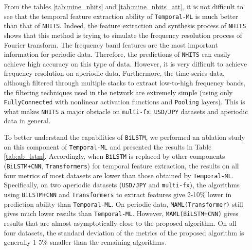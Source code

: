 \documentclass[a4paper,fleqn]{cas-sc}
\begin{document}
From the tables \ref{tab:mine_nhits} and \ref{tab:mine_nhits_att}, it is not difficult to see that the temporal feature extraction ability of \verb|Temporal-ML| is much better than that of \verb|NHITS|. Indeed, the feature extraction and synthesis process of \verb|NHITS| shows that this method is trying to simulate the frequency resolution process of Fourier transform. The frequency band features are the most important information for periodic data. Therefore, the predictions of \verb|NHITS| can easily achieve high accuracy on this type of data. However, it is very difficult to achieve frequency resolution on aperiodic data. Furthermore, the time-series data, although filtered through multiple stacks to extract low-to-high frequency bands, the filtering techniques used in the network are extremely simple (using only \verb|FullyConnected| with nonlinear activation functions and \verb|Pooling| layers). This is what makes \verb|NHITS| a major obstacle on \verb|multi-fx|, \verb|USD/JPY| datasets and aperiodic data in general.

\vspace{1mm}

To better understand the capabilities of \verb|BiLSTM|, we performed an ablation study on this component of \verb|Temporal-ML| and presented the results in Table \ref{tab:ab_lstm}. Accordingly, when \verb|BiLSTM| is replaced by other components (\verb|BiLSTM+CNN|, \verb|Transformers|) for temporal feature extraction, the results on all four metrics of most datasets are lower than those obtained by \verb|Temporal-ML|. Specifically, on two aperiodic datasets (\verb|USD/JPY| and \verb|multi-fx|), the algorithms using \verb|BiLSTM+CNN| and \verb|Transformers| to extract features give 2-10\% lower in prediction ability than \verb|Temporal-ML|. On periodic data, \verb|MAML(Transformer)| still gives much lower results than \verb|Temporal-ML|. However, \verb|MAML(BiLSTM+CNN)| gives results that are almost asymptotically close to the proposed algorithm. On all four datasets, the standard deviation of the metrics of the proposed algorithm is generally 1-5\% smaller than the remaining algorithms.

\vspace{1mm}
\end{document}

